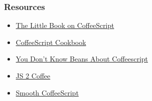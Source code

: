 \documentclass{beamer}
\begin{document}
\begin{frame}
  \frametitle{Resources}
  \begin{itemize}
    \item \href{http://arcturo.github.io/library/coffeescript/}{The
        Little Book on CoffeeScript}
    \item \href{http://www.coffeescriptcookbook.com}{CoffeeScript Cookbook}
    \item \href{http://aseemk.com/talks/intro-to-coffeescript}{You
        Don\rq t Know Beans About Coffeescript}
    \item \href{http://js2coffee.org/}{JS 2 Coffee}
    \item
      \href{http://autotelicum.github.io/Smooth-CoffeeScript/}{Smooth CoffeeScript}
  \end{itemize}
\end{frame}
\end{document}
